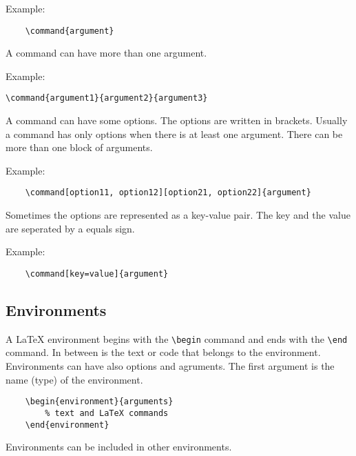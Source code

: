 Example:
\begin{lstlisting}
	\command{argument}
\end{lstlisting}

A command can have more than one argument.

Example:
\begin{lstlisting}
\command{argument1}{argument2}{argument3}
\end{lstlisting}

A command can have some options. The options are written in brackets.
Usually a command has only options when there is at least one argument.
There can be more than one block of arguments.

Example:
\begin{lstlisting}
	\command[option11, option12][option21, option22]{argument}
\end{lstlisting}

Sometimes the options are represented as a key-value pair. The key and the value are seperated by a equals sign.

Example:
\begin{lstlisting}
	\command[key=value]{argument}
\end{lstlisting}

\subsection{Environments}
A LaTeX environment begins with the \lstinline{\begin} command and ends with the \lstinline{\end} command. In between is the text or code that belongs to the environment. Environments can have also options and agruments. The first argument is the name (type) of the environment.

\begin{lstlisting}
	\begin{environment}{arguments}
		% text and LaTeX commands
	\end{environment}
\end{lstlisting}

Environments can be included in other environments.


